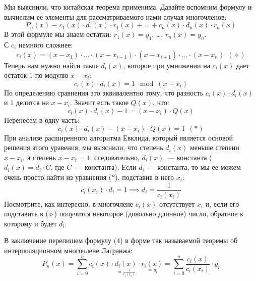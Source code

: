 \documentclass[russian]{lecture-notes}
\theoremstyle{definition}
\begin{document}
    Мы выяснили, что китайская теорема применима. Давайте вспомним формулу и вычислим её элементы для рассматриваемого нами случая многочленов:
    \begin{equation}
        P_n(x) \equiv c_1(x) \cdot d_1(x) \cdot r_1(x) + \ldots + c_n(x) \cdot d_n(x) \cdot r_n(x)
    \end{equation}
    В этой формуле мы знаем остатки: $r_1(x) = y_1$, \ldots , $r_n(x) = y_n$.
    \\
    С $c_i$ немного сложнее:
    \[
        c_i(x) = (x - x_1) \cdot \ldots \cdot (x - x_{i-1}) \cdot (x - x_{i+1}) \cdot \ldots \cdot (x - x_n) \ \ (\diamond)
    \]
    Теперь нам нужно найти такое $d_i(x)$, которое при умножении на $c_i(x)$ дает остаток $1$ по модулю $x - x_i$:
    \[
        c_i(x) \cdot d_i(x) = 1 \mod{(x - x_i)}
    \]
    По определению сравнения это эквивалентно тому, что разность $c_i(x) \cdot d_i(x)$ и $1$ делится на $x - x_i$. Значит есть такое $Q(x)$, что:
    \[
        c_i(x) \cdot d_i(x) - 1 = (x - x_i) \cdot Q(x)
    \]
    Перенесем в одну часть:
    \[
        c_i(x) \cdot d_i(x) - (x - x_i) \cdot Q(x) = 1 \ \ (\ast)
    \]
    При анализе расширенного алгоритма Евклида, который является основой решения этого уравения, мы выяснили, что степень $d_i(x)$ меньше степени $x - x_i$, а степень $x - x_i = 1$, следовательно, $d_i(x)$~--- константа ($d_i(x) = d_i \cdot C$, где $C$~--- константа). Если $d_i$~--- константа, то мы ее можем очень просто найти из уравнения ($\ast$), подставив в него $x_i$:
    \[
        c_i(x_i) \cdot d_i = 1 \implies d_i = \frac{1}{c_i(x_i)}
    \]
    Посмотрите, как интересно, в многочлене $c_i(x)$ отсутствует $x_i$ и, если его подставить в ($\diamond$) получится некоторое (довольно длинное) число, обратное к которому и будет $d_i$.

    В заключение перепишем формулу (4) в форме так называемой теоремы об интерполяционном многочлене Лагранжа:
    \[
        P_n(x) = \sum_{i=0}^{n} c_i(x) \cdot \underset{= \frac{1}{c_i(x_i)}}{d_i(x)} \cdot \underset{= y_i}{r_i(x)} = \sum_{i=0}^{n} \frac{c_i(x)}{c_i(x_i)} \cdot y_i
    \]
\end{document}
